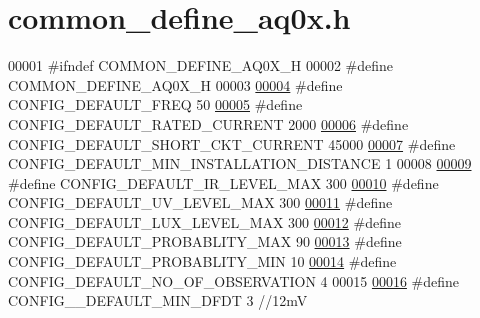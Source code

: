 \hypertarget{a00086_source}{\section{common\+\_\+define\+\_\+aq0x.\+h}
\label{a00086_source}
}

\begin{DoxyCode}
00001 \textcolor{preprocessor}{#ifndef COMMON\_DEFINE\_AQ0X\_H}
00002 \textcolor{preprocessor}{#define COMMON\_DEFINE\_AQ0X\_H}
00003 
\hypertarget{a00086_source_l00004}{}\hyperlink{a00086_a985a153b3edd3d7d638137ae0b9e5e67}{00004} \textcolor{preprocessor}{#define CONFIG\_DEFAULT\_FREQ                                     50}
\hypertarget{a00086_source_l00005}{}\hyperlink{a00086_ae329eb408f386777cbb443c27ca7c1c5}{00005} \textcolor{preprocessor}{#define CONFIG\_DEFAULT\_RATED\_CURRENT                            2000}
\hypertarget{a00086_source_l00006}{}\hyperlink{a00086_a9b142f2e7d26511af74c411c0e524384}{00006} \textcolor{preprocessor}{#define CONFIG\_DEFAULT\_SHORT\_CKT\_CURRENT                        45000}
\hypertarget{a00086_source_l00007}{}\hyperlink{a00086_aad4ef21bb535ed8bbba5a4f2d0451711}{00007} \textcolor{preprocessor}{#define CONFIG\_DEFAULT\_MIN\_INSTALLATION\_DISTANCE                1}
00008 
\hypertarget{a00086_source_l00009}{}\hyperlink{a00086_adf882de105367de21f0cbfe4490a046f}{00009} \textcolor{preprocessor}{#define CONFIG\_DEFAULT\_IR\_LEVEL\_MAX                             300}
\hypertarget{a00086_source_l00010}{}\hyperlink{a00086_a29f761c18bae89d087200e4f1891c651}{00010} \textcolor{preprocessor}{#define CONFIG\_DEFAULT\_UV\_LEVEL\_MAX                             300}
\hypertarget{a00086_source_l00011}{}\hyperlink{a00086_a04ab25767fbb61ec61784da889ec8c09}{00011} \textcolor{preprocessor}{#define CONFIG\_DEFAULT\_LUX\_LEVEL\_MAX                            300}
\hypertarget{a00086_source_l00012}{}\hyperlink{a00086_a96cf926b530a1d5968881620d2f10445}{00012} \textcolor{preprocessor}{#define CONFIG\_DEFAULT\_PROBABLITY\_MAX                           90}
\hypertarget{a00086_source_l00013}{}\hyperlink{a00086_a599be42d4b357badb7c9b16a124a186a}{00013} \textcolor{preprocessor}{#define CONFIG\_DEFAULT\_PROBABLITY\_MIN                           10}
\hypertarget{a00086_source_l00014}{}\hyperlink{a00086_af69b35a9f07bfcfe500538565d898c65}{00014} \textcolor{preprocessor}{#define CONFIG\_DEFAULT\_NO\_OF\_OBSERVATION                        4}
00015 
\hypertarget{a00086_source_l00016}{}\hyperlink{a00086_a0eae7c540b766617bb00f79cd63415a2}{00016} \textcolor{preprocessor}{#define CONFIG\_\_DEFAULT\_MIN\_DFDT                                3     //12mV}

\end{DoxyCode}
